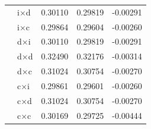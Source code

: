 \begin{longtable}{l l r r r}
   & i×d & 0.30110 & 0.29819 & -0.00291 \\
   & i×c & 0.29864 & 0.29604 & -0.00260 \\
   & d×i & 0.30110 & 0.29819 & -0.00291 \\
   & d×d & 0.32490 & 0.32176 & -0.00314 \\
   & d×c & 0.31024 & 0.30754 & -0.00270 \\
   & c×i & 0.29861 & 0.29601 & -0.00260 \\
   & c×d & 0.31024 & 0.30754 & -0.00270 \\
   & c×c & 0.30169 & 0.29725 & -0.00444 \\
\midrule
\bottomrule
\end{longtable}
